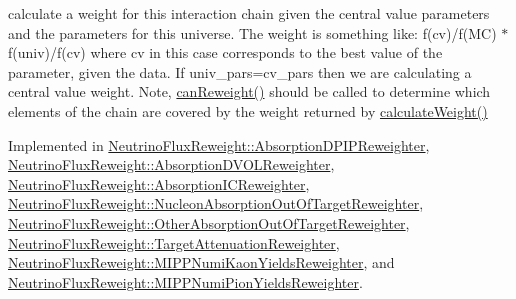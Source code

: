 calculate a weight for this interaction chain given the central value parameters and the parameters for this universe. The weight is something like\-: f(cv)/f(M\-C) $\ast$ f(univ)/f(cv) where cv in this case corresponds to the best value of the parameter, given the data. If univ\-\_\-pars=cv\-\_\-pars then we are calculating a central value weight. Note, \hyperlink{class_neutrino_flux_reweight_1_1_i_interaction_chain_reweighting_aacf17580c1d316f0ebcdfdff7418e9e3}{can\-Reweight()} should be called to determine which elements of the chain are covered by the weight returned by \hyperlink{class_neutrino_flux_reweight_1_1_i_interaction_chain_reweighting_ae28403553637013fdc720674ee24c7c5}{calculate\-Weight()} 



Implemented in \hyperlink{class_neutrino_flux_reweight_1_1_absorption_d_p_i_p_reweighter_a8b1fcaecb31a3612ec2f5e2a0026bcb6}{Neutrino\-Flux\-Reweight\-::\-Absorption\-D\-P\-I\-P\-Reweighter}, \hyperlink{class_neutrino_flux_reweight_1_1_absorption_d_v_o_l_reweighter_abe4d5b881334283ded041e46d2613608}{Neutrino\-Flux\-Reweight\-::\-Absorption\-D\-V\-O\-L\-Reweighter}, \hyperlink{class_neutrino_flux_reweight_1_1_absorption_i_c_reweighter_a07104ede5adc45dfeda61fc90004bec3}{Neutrino\-Flux\-Reweight\-::\-Absorption\-I\-C\-Reweighter}, \hyperlink{class_neutrino_flux_reweight_1_1_nucleon_absorption_out_of_target_reweighter_a295719b84abffcab3d2cdf3a4aadb7b7}{Neutrino\-Flux\-Reweight\-::\-Nucleon\-Absorption\-Out\-Of\-Target\-Reweighter}, \hyperlink{class_neutrino_flux_reweight_1_1_other_absorption_out_of_target_reweighter_abebfe35083e25e8bca9eb0bf991d74d9}{Neutrino\-Flux\-Reweight\-::\-Other\-Absorption\-Out\-Of\-Target\-Reweighter}, \hyperlink{class_neutrino_flux_reweight_1_1_target_attenuation_reweighter_a58691aeda33f770a28cd27f677ae790f}{Neutrino\-Flux\-Reweight\-::\-Target\-Attenuation\-Reweighter}, \hyperlink{class_neutrino_flux_reweight_1_1_m_i_p_p_numi_kaon_yields_reweighter_ad9503e13848e30f432c297ed70e24134}{Neutrino\-Flux\-Reweight\-::\-M\-I\-P\-P\-Numi\-Kaon\-Yields\-Reweighter}, and \hyperlink{class_neutrino_flux_reweight_1_1_m_i_p_p_numi_pion_yields_reweighter_a84ef113a8ef34c2f9f5813938ec35382}{Neutrino\-Flux\-Reweight\-::\-M\-I\-P\-P\-Numi\-Pion\-Yields\-Reweighter}.

